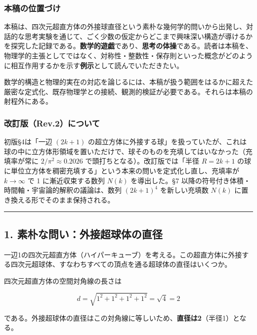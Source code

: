 \documentclass[a4paper,11pt]{ltjsarticle}
\theoremstyle{definition}
\begin{document}
\subsubsection{本稿の位置づけ}\label{ux672cux7a3fux306eux4f4dux7f6eux3065ux3051}

本稿は、四次元超直方体の外接球直径という素朴な幾何学的問いから出発し、対話的な思考実験を通じて、ごく少数の仮定からどこまで興味深い構造が導けるかを探究した記録である。\textbf{数学的遊戯}であり、\textbf{思考の体操}である。読者は本稿を、物理学的主張としてではなく、対称性・整数性・保存則といった概念がどのように相互作用するかを示す\textbf{例示}として読んでいただきたい。

数学的構造と物理的実在の対応を論じるには、本稿が扱う範囲をはるかに超えた厳密な定式化、既存物理学との接続、観測的検証が必要である。それらは本稿の射程外にある。

\subsubsection{改訂版（Rev.2）について}\label{ux6539ux8a02ux7248rev.2ux306bux3064ux3044ux3066}

初版§4は「一辺 \((2k+1)\)
の超立方体に外接する球」を扱っていたが、これは球の中に立方体形領域を置いただけで、球そのものを充填してはいなかった（充填率が常に
\(2/\pi^2 \approx 0.2026\) で頭打ちとなる）。改訂版では「半径
\(R = 2k+1\)
の球に単位立方体を稠密充填する」という本来の問いを定式化し直し、充填率が
\(k \to \infty\) で 1 に漸近収束する数列 \(N(k)\) を導出した。§7
以降の符号付き体積・時間軸・宇宙論的解釈の議論は、数列 \((2k+1)^4\)
を新しい充填数 \(N(k)\) に置き換える形でそのまま保持される。

\begin{center}\rule{0.5\linewidth}{0.5pt}\end{center}

\subsection{1.
素朴な問い：外接超球体の直径}\label{ux7d20ux6734ux306aux554fux3044ux5916ux63a5ux8d85ux7403ux4f53ux306eux76f4ux5f84}

一辺1の四次元超直方体（ハイパーキューブ）を考える。この超直方体に外接する四次元超球体、すなわちすべての頂点を通る超球体の直径はいくつか。

四次元超直方体の空間対角線の長さは

\[d = \sqrt{1^2 + 1^2 + 1^2 + 1^2} = \sqrt{4} = 2\]

である。外接超球体の直径はこの対角線に等しいため、\textbf{直径は2}（半径1）となる。
\end{document}
